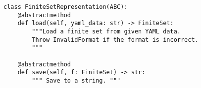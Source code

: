 \par\begin{minipage}{60ex}
\begin{verbatim}
class FiniteSetRepresentation(ABC):
    @abstractmethod
    def load(self, yaml_data: str) -> FiniteSet:
        """Load a finite set from given YAML data.
        Throw InvalidFormat if the format is incorrect.
        """

    @abstractmethod
    def save(self, f: FiniteSet) -> str:
        """ Save to a string. """
\end{verbatim}
\end{minipage}\par